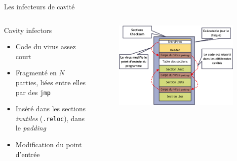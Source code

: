 \documentclass{beamer}
\begin{document}
\begin{frame}{Les infecteurs de cavité}
\begin{columns}[t]
\begin{column}{4cm}
\begin{exampleblock}{Cavity infectors}
\begin{itemize}
\item Code du virus assez court
\item Fragmenté en $N$ parties, liées entre elles par des \texttt{jmp}
\item Inséré dans les sections \textit{inutiles} (\texttt{.reloc}), dans le \textit{padding}
\item Modification du point d'entrée
\end{itemize}
\end{exampleblock}
\end{column}
\begin{column}{6cm}
\begin{figure}[!ht]
\includegraphics[scale=0.32]{cavite.png}
\center
\end{figure}
\end{column}
\end{columns}
\end{frame}
\end{document}

